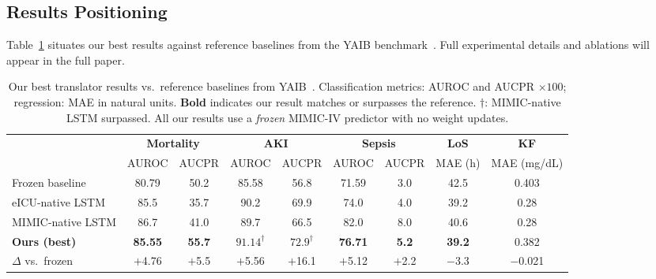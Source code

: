 \subsection{Results Positioning}
\label{sec:results_position}

Table~\ref{tab:results_position} situates our best results against
reference baselines from the YAIB benchmark~\cite{vandewater2024yaib}.
Full experimental details and ablations will appear in the full paper.

\begin{table}[t]
\centering
\caption{Our best translator results vs.\ reference baselines from YAIB~\cite{vandewater2024yaib}.
Classification metrics: AUROC and AUCPR $\times 100$; regression: MAE in natural units.
\textbf{Bold} indicates our result matches or surpasses the reference.
$\dagger$: MIMIC-native LSTM surpassed.
All our results use a \emph{frozen} MIMIC-IV predictor with no weight updates.}
\label{tab:results_position}
\small
\setlength{\tabcolsep}{3.2pt}
\begin{tabular}{@{}lcccccccc@{}}
\toprule
& \multicolumn{2}{c}{\textbf{Mortality}} & \multicolumn{2}{c}{\textbf{AKI}} & \multicolumn{2}{c}{\textbf{Sepsis}} & \textbf{LoS} & \textbf{KF} \\
& AUROC & AUCPR & AUROC & AUCPR & AUROC & AUCPR & MAE (h) & MAE (mg/dL) \\
\midrule
Frozen baseline  & 80.79 & 50.2 & 85.58 & 56.8 & 71.59 & 3.0 & 42.5 & 0.403 \\
eICU-native LSTM & 85.5  & 35.7 & 90.2  & 69.9 & 74.0  & 4.0 & 39.2 & 0.28 \\
MIMIC-native LSTM& 86.7  & 41.0 & 89.7  & 66.5 & 82.0  & 8.0 & 40.6 & 0.28 \\
\midrule
\textbf{Ours (best)}
  & \textbf{85.55} & \textbf{55.7} & $\mathbf{91.14}^\dagger$ & $\mathbf{72.9}^\dagger$ & \textbf{76.71} & \textbf{5.2} & \textbf{39.2} & 0.382 \\
$\Delta$ vs.\ frozen
  & $+$4.76 & $+$5.5 & $+$5.56 & $+$16.1 & $+$5.12 & $+$2.2 & $-$3.3 & $-$0.021 \\
\bottomrule
\end{tabular}
\vspace{-4pt}
\end{table}

